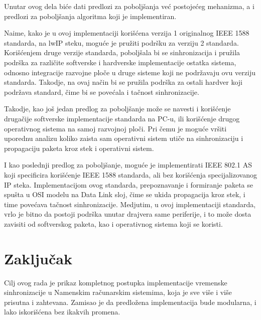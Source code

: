 \documentclass[a4paper,12pt, master]{etf}
\begin{document}
	Unutar ovog dela bi\'{c}e dati predlozi za pobolj\v{s}anja ve\'{c}
	postoje\'{c}eg mehanizma, a i predlozi za pobolj\v{s}anja algoritma koji je
	implementiran.

	Naime, kako je u ovoj implementaciji kori\v{s}\'{c}ena verzija 1
	originalnog IEEE 1588 standarda, na lwIP steku, mogu\'{c}e je pru\v{z}iti
	podr\v{s}ku za verziju 2 standarda. Kori\v{s}\'{c}enjem druge verzije
	standarda, pobolj\v{s}ala bi se sinhronizacija i pru\v{z}ila podr\v{s}ka za
	razli\v{c}ite softverske i hardverske implementacije ostatka sistema,
	odnosno integracije razvojne plo\v{c}e u druge sisteme koji ne
	podr\v{z}avaju ovu verziju standarda. Takodje, na ovaj na\v{c}in bi se
	pru\v{z}ila podr\v{s}ka za ostali hardver koji podr\v{z}ava standard,
	\v{c}ime bi se pove\'{c}ala i ta\v{c}nost sinhronizacije.

	Takodje, kao jo\v{s} jedan predlog za pobolj\v{s}anje mo\v{z}e se navesti i
	kori\v{s}\'{c}enje druga\v{c}ije softverske implementacije standarda na
	PC-u, ili kori\v{s}\'{c}enje drugog operativnog sistema na samoj razvojnoj
	plo\v{c}i. Pri \v{c}emu je mogu\'{c}e vr\v{s}iti uporednu analizu koliko
	zaista sam operativni sistem uti\v{c}e na sinhronizaciju i propagaciju
	paketa kroz stek i operativni sistem.

	I kao poslednji predlog za pobolj\v{s}anje, mogu\'{c}e je implementirati
	IEEE 802.1 AS koji specificira kori\v{s}\'{c}enje IEEE 1588 standarda, ali
	bez kori\v{s}\'{c}enja specijalizovanog IP steka. Implementacijom ovog
	standarda, prepoznavanje i formiranje paketa se spu\v{s}ta u OSI modelu na
	Data Link sloj, \v{c}ime se ukida propagacija kroz stek, i time pove\'{c}ava
    ta\v{c}nost sinhronizacije. Medjutim, u ovoj implementaciji standarda, vrlo
    je bitno da postoji podr\v{s}ka unutar drajvera same periferije, i to
    mo\v{z}e dosta zavisiti od softverskog paketa, kao i operativnog sistema
    koji se koristi.

	\newpage

    \chapter*{Zaklju\v{c}ak}

	Cilj ovog rada je prikaz kompletnog postupka implementacije vremenske
	sinhronizacije u Namenskim ra\v{c}unarskim sistemima, koja je sve vi\v{s}e
	i vi\v{s}e prisutna i zahtevana. Zamisao je da predlo\v{z}ena
	implementacija bude modularna, i lako iskori\v{s}\'{c}ena bez ikakvih
	promena.
\end{document}
